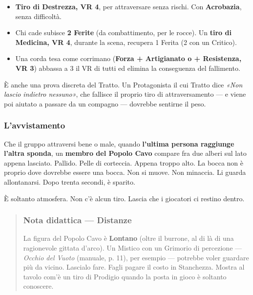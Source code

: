 \documentclass[10pt,a4paper]{article}
\newcommand{\tightlist}{\setlength{\itemsep}{0pt}\setlength{\parskip}{0pt}}
\begin{document}
\begin{itemize}
\tightlist
\item
  \textbf{Tiro di Destrezza, VR 4}, per attraversare senza rischi. Con \textbf{Acrobazia}, senza difficoltà.
\item
  Chi cade subisce \textbf{2 Ferite} (da combattimento, per le rocce). Un \textbf{tiro di Medicina, VR 4}, durante la scena, recupera 1 Ferita (2 con un Critico).
\item
  Una corda tesa come corrimano (\textbf{Forza + Artigianato o + Resistenza, VR 3}) abbassa a 3 il VR di tutti ed elimina la conseguenza del fallimento.
\end{itemize}

È anche una prova discreta del Tratto. Un Protagonista il cui Tratto dice \emph{«Non lascio indietro nessuno»}, che fallisce il proprio tiro di attraversamento --- e viene poi aiutato a passare da un compagno --- dovrebbe sentirne il peso.

\subsubsection{L'avvistamento}\label{lavvistamento}

Che il gruppo attraversi bene o male, quando \textbf{l'ultima persona raggiunge l'altra sponda}, un \textbf{membro del Popolo Cavo} compare fra due alberi sul lato appena lasciato. Pallido. Pelle di corteccia. Appena troppo alto. La bocca non è proprio dove dovrebbe essere una bocca. Non si muove. Non minaccia. Li guarda allontanarsi. Dopo trenta secondi, è sparito.

È soltanto atmosfera. Non c'è alcun tiro. Lascia che i giocatori ci restino dentro.

\begin{quote}
\subsubsection{Nota didattica --- Distanze}\label{nota-didattica-distanze}

La figura del Popolo Cavo è \textbf{Lontano} (oltre il burrone, al di là di una ragionevole gittata d'arco). Un Mistico con un Grimorio di percezione --- \emph{Occhio del Vuoto} (manuale, p. 11), per esempio --- potrebbe voler guardare più da vicino. Lascialo fare. Fagli pagare il costo in Stanchezza. Mostra al tavolo com'è un tiro di Prodigio quando la posta in gioco è soltanto conoscere.
\end{quote}
\end{document}
